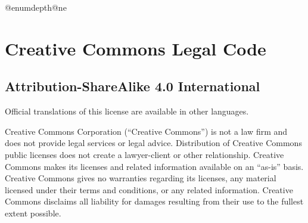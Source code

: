 \advance\csname @enumdepth\endcsname\csname @ne\endcsname
\section{Creative Commons Legal Code}

\subsection{Attribution-ShareAlike 4.0 International}







Official translations of this license are available in other languages.



\par Creative Commons Corporation (“Creative Commons”) is not a law firm and does not provide legal services or legal advice. Distribution of Creative Commons public licenses does not create a lawyer-client or other relationship. Creative Commons makes its licenses and related information available on an “as-is” basis. Creative Commons gives no warranties regarding its licenses, any material licensed under their terms and conditions, or any related information. Creative Commons disclaims all liability for damages resulting from their use to the fullest extent possible.


